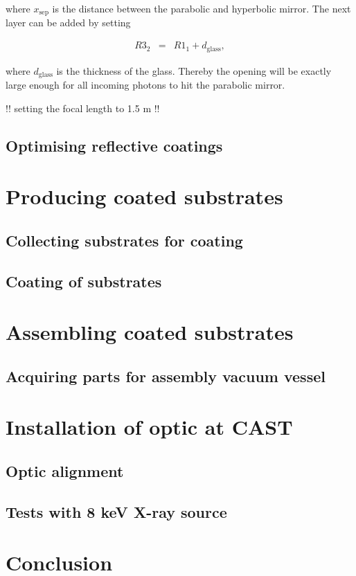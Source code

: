 where $x_{\text{sep}}$ is the distance between the parabolic and hyperbolic mirror. The next layer can be added by setting

\begin{eqnarray}
  \mathit{R3}_2 &=& \mathit{R1}_1 + d_{\text{glass}},
\end{eqnarray}

where $d_{\text{glass}}$ is the thickness of the glass. Thereby the opening will be exactly large enough for all incoming photons to hit the parabolic mirror.


!! setting the focal length to 1.5 m !!


\subsection{Optimising reflective coatings}


\section{Producing coated substrates}


\subsection{Collecting substrates for coating}

\subsection{Coating of substrates}



\section{Assembling coated substrates}


\subsection{Acquiring parts for assembly vacuum vessel}


\section{Installation of optic at CAST}


\subsection{Optic alignment}

\subsection{Tests with 8 keV X-ray source}

\section{Conclusion}
